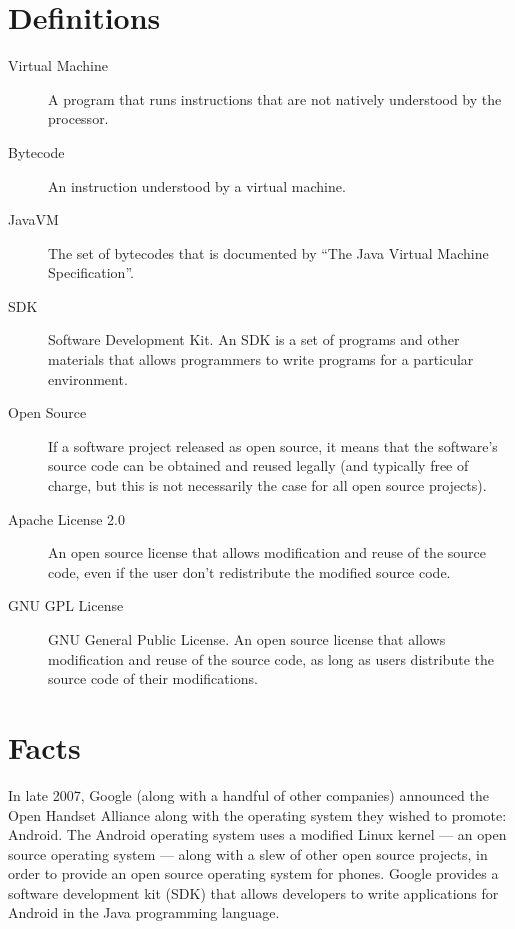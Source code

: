 \documentclass[11pt]{article}
\begin{document}
\begin{multicols}{2}
\setcounter{page}{1}

\section{Definitions} %
\label{sec:defs}

\begin{description}
    \item[Virtual Machine] A program that runs instructions that are not
    natively understood by the processor.
    \item[Bytecode] An instruction understood by a virtual machine.
    \item[JavaVM] The set of bytecodes that is documented by ``The Java Virtual
    Machine Specification''. \cite{javavm-bytecode}
    \item[SDK] Software Development Kit.  An SDK is a set of programs and other
    materials that allows programmers to write programs for a particular
    environment.
    \item[Open Source] If a software project released as open source, it means
    that the software's source code can be obtained and reused legally (and
    typically free of charge, but this is not necessarily the case for all open
    source projects).
    \item[Apache License 2.0] An open source license that allows modification
    and reuse of the source code, even if the user don't redistribute the
    modified source code. \cite{apache-license}
    \item[GNU GPL License] GNU General Public License.  An open source license
    that allows modification and reuse of the source code, as long as users
    distribute the source code of their modifications. \cite{gpl-license}
\end{description}


\section{Facts} %
\label{sec:facts}

In late 2007, Google (along with a handful of other companies) announced the
Open Handset Alliance \cite{open-handset-alliance-ann} along with the operating
system they wished to promote: Android.  The Android operating system uses a
modified Linux kernel --- an open source operating system --- along with a slew
of other open source projects, in order to provide an open source operating
system for phones.  Google provides a software development kit (SDK) that allows
developers to write applications for Android in the Java programming language.


\end{multicols}
\end{document}
